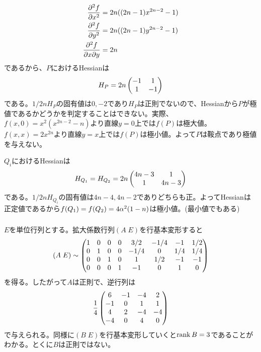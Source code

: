 \begin{sol}
\begin{description}
\begin{align*}
\frac{\partial^2 f }{\partial x^2} &= 2n ( (2n-1)x^{2n-2} - 1 ) \\
\frac{\partial^2 f }{\partial y^2} &= 2n ( (2n-1)y^{2n-2} - 1 ) \\
\frac{\partial^2 f }{\partial x \partial y} &= 2n
    \end{align*}
    であるから、$P$におけるHessianは
    \[
    H_P = 2n \begin{pmatrix} -1 & 1 \\ 1 & -1 \end{pmatrix}
    \]
    である。$1/2n H_P$の固有値は$0, -2$であり$H_P$は正則でないので、Hessianから$P$が極値であるかどうかを判定することはできない。実際、$f(x,0)=x^2(x^{2n-2}-n)$より直線$y=0$上では$f(P)$は極大値。$f(x,x) = 2x^{2n}$より直線$y=x$上では$f(P)$は極小値。よって$P$は鞍点であり極値を与えない。

$Q_i$におけるHessianは
\[
H_{Q_1} = H_{Q_2} =  2n \begin{pmatrix} 4n-3 & 1 \\ 1 & 4n-3 \end{pmatrix}
\]
である。$1/2n H_{Q_i}$の固有値は$4n-4, 4n-2$でありどちらも正。よってHessianは正定値であるから$f(Q_1)=f(Q_2) = 4{\alpha}^2 (1-n)$は極小値。(最小値でもある)
  \end{description}
\end{sol}

\newpage

\subsubsection{}%
\begin{sol}
  $E$を単位行列とする。拡大係数行列$(A \; E)$を行基本変形すると
  \[
   (A \; E) \sim \begin{pmatrix}  1 &0& 0& 0& 3/2& -1/4& -1& 1/2 \\ 0& 1& 0& 0& -1/4& 0& 1/4& 1/4 \\ 0 &0& 1& 0 & 1& 1/2 &-1& -1 \\ 0& 0& 0& 1& -1& 0& 1& 0 \end{pmatrix}
  \]
  を得る。したがって$A$は正則で、逆行列は
  \[
  \frac{1}{4} \begin{pmatrix}  6 &-1& -4& 2 \\ -1& 0& 1& 1 \\ 4& 2& -4& -4 \\ -4& 0& 4& 0   \end{pmatrix}
  \]
  で与えられる。同様に$(B \; E)$を行基本変形していくと$\operatorname{rank} B = 3$であることがわかる。とくに$B$は正則ではない。
\end{sol}


